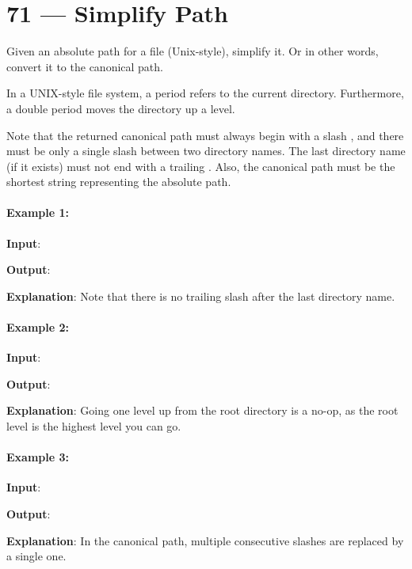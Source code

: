 \section{71 --- Simplify Path}
Given an absolute path for a file (Unix-style), simplify it. Or in other words, convert it to the canonical path.

In a UNIX-style file system, a period  refers to the current directory. Furthermore, a double period  moves the directory up a level.

Note that the returned canonical path must always begin with a slash \fcj{/}, and there must be only a single slash \fcj{/} between two directory names. The last directory name (if it exists) must not end with a trailing \fcj{/}. Also, the canonical path must be the shortest string representing the absolute path.
 

\paragraph{Example 1:}

\begin{flushleft}
\textbf{Input}: 

\textbf{Output}: 

\textbf{Explanation}: Note that there is no trailing slash after the last directory name.
\end{flushleft}

\paragraph{Example 2:}
\begin{flushleft}
\textbf{Input}: 

\textbf{Output}: 

\textbf{Explanation}: Going one level up from the root directory is a no-op, as the root level is the highest level you can go.
\end{flushleft}
\paragraph{Example 3:}
\begin{flushleft}


\textbf{Input}: 

\textbf{Output}: 

\textbf{Explanation}: In the canonical path, multiple consecutive slashes are replaced by a single one.
\end{flushleft}
